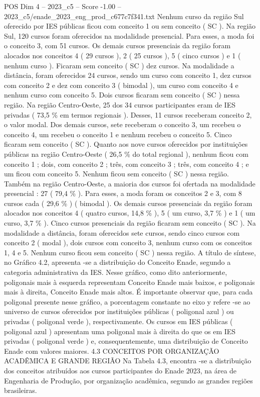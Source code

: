 \begin{textsample}{POS Dim 4 – 2023\_c5 – Score -1.00 – 2023\_c5/enade\_2023\_eng\_prod\_c677c7f341.txt}
Nenhum curso da região Sul oferecido por IES públicas ficou com conceito 1 ou sem conceito ( SC ).
Na região Sul, 120 cursos foram oferecidos na modalidade presencial.
Para esses, a moda foi o conceito 3, com 51 cursos.
Os demais cursos presenciais da região foram alocados nos conceitos 4 ( 29 cursos ), 2 ( 25 cursos ), 5 ( cinco cursos ) e 1 ( nenhum curso ).
Ficaram sem conceito ( SC ) dez cursos.
Na modalidade a distância, foram oferecidos 24 cursos, sendo um curso com conceito 1, dez cursos com conceito 2 e dez com conceito 3 ( bimodal ), um curso com conceito 4 e nenhum curso com conceito 5.
Dois cursos ficaram sem conceito ( SC ) nessa região.
Na região Centro-Oeste, 25 dos 34 cursos participantes eram de IES privadas ( 73,5 \% em termos regionais ).
Desses, 11 cursos receberam conceito 2, o valor modal.
Dos demais cursos, sete receberam o conceito 3, um recebeu o conceito 4, um recebeu o conceito 1 e nenhum recebeu o conceito 5.
Cinco ficaram sem conceito ( SC ).
Quanto aos nove cursos oferecidos por instituições públicas na região Centro-Oeste ( 26,5 \% do total regional ), nenhum ficou com conceito 1 ; dois, com conceito 2 ; três, com conceito 3 ; três, com conceito 4 ; e um ficou com conceito 5.
Nenhum ficou sem conceito ( SC ) nessa região.
Também na região Centro-Oeste, a maioria dos cursos foi ofertada na modalidade presencial : 27 ( 79,4 \% ).
Para esses, a moda foram os conceitos 2 e 3, com 8 cursos cada ( 29,6 \% ) ( bimodal ).
Os demais cursos presenciais da região foram alocados nos conceitos 4 ( quatro cursos, 14,8 \% ), 5 ( um curso, 3,7 \% ) e 1 ( um curso, 3,7 \% ).
Cinco cursos presenciais da região ficaram sem conceito ( SC ).
Na modalidade a distância, foram oferecidos sete cursos, sendo cinco cursos com conceito 2 ( modal ), dois cursos com conceito 3, nenhum curso com os conceitos 1, 4 e 5.
Nenhum curso ficou sem conceito ( SC ) nessa região.
A título de síntese, no Gráfico 4.2, apresenta -se a distribuição do Conceito Enade, segundo a categoria administrativa da IES.
Nesse gráfico, como dito anteriormente, poligonais mais à esquerda representam Conceito Enade mais baixos, e poligonais mais à direita, Conceito Enade mais altos.
É importante observar que, para cada poligonal presente nesse gráfico, a porcentagem constante no eixo y refere -se ao universo de cursos oferecidos por instituições públicas ( poligonal azul ) ou privadas ( poligonal verde ), respectivamente.
Os cursos em IES públicas ( poligonal azul ) apresentam uma poligonal mais à direita do que os em IES privadas ( poligonal verde ) e, consequentemente, uma distribuição de Conceito Enade com valores maiores. 4.3 CONCEITOS POR ORGANIZAÇÃO ACADÊMICA E GRANDE REGIÃO Na Tabela 4.3, encontra -se a distribuição dos conceitos atribuídos aos cursos participantes do Enade 2023, na área de Engenharia de Produção, por organização acadêmica, segundo as grandes regiões brasileiras.

\end{textsample}
